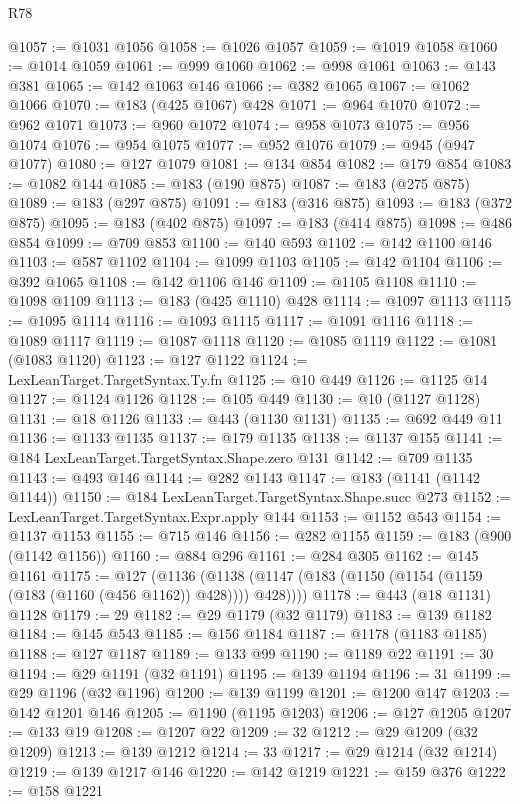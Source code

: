 \begin{lexlean}{R78}
\begin{coremodule}
@1057 := @1031 @1056
@1058 := @1026 @1057
@1059 := @1019 @1058
@1060 := @1014 @1059
@1061 := @999 @1060
@1062 := @998 @1061
@1063 := @143 @381
@1065 := @142 @1063 @146
@1066 := @382 @1065
@1067 := @1062 @1066
@1070 := @183 (@425 @1067) @428
@1071 := @964 @1070
@1072 := @962 @1071
@1073 := @960 @1072
@1074 := @958 @1073
@1075 := @956 @1074
@1076 := @954 @1075
@1077 := @952 @1076
@1079 := @945 (@947 @1077)
@1080 := @127 @1079
@1081 := @134 @854
@1082 := @179 @854
@1083 := @1082 @144
@1085 := @183 (@190 @875)
@1087 := @183 (@275 @875)
@1089 := @183 (@297 @875)
@1091 := @183 (@316 @875)
@1093 := @183 (@372 @875)
@1095 := @183 (@402 @875)
@1097 := @183 (@414 @875)
@1098 := @486 @854
@1099 := @709 @853
@1100 := @140 @593
@1102 := @142 @1100 @146
@1103 := @587 @1102
@1104 := @1099 @1103
@1105 := @142 @1104
@1106 := @392 @1065
@1108 := @142 @1106 @146
@1109 := @1105 @1108
@1110 := @1098 @1109
@1113 := @183 (@425 @1110) @428
@1114 := @1097 @1113
@1115 := @1095 @1114
@1116 := @1093 @1115
@1117 := @1091 @1116
@1118 := @1089 @1117
@1119 := @1087 @1118
@1120 := @1085 @1119
@1122 := @1081 (@1083 @1120)
@1123 := @127 @1122
@1124 := LexLeanTarget.TargetSyntax.Ty.fn
@1125 := @10 @449
@1126 := @1125 @14
@1127 := @1124 @1126
@1128 := @105 @449
@1130 := @10 (@1127 @1128)
@1131 := @18 @1126
@1133 := @443 (@1130 @1131)
@1135 := @692 @449 @11
@1136 := @1133 @1135
@1137 := @179 @1135
@1138 := @1137 @155
@1141 := @184 LexLeanTarget.TargetSyntax.Shape.zero @131
@1142 := @709 @1135
@1143 := @493 @146
@1144 := @282 @1143
@1147 := @183 (@1141 (@1142 @1144))
@1150 := @184 LexLeanTarget.TargetSyntax.Shape.succ @273
@1152 := LexLeanTarget.TargetSyntax.Expr.apply @144
@1153 := @1152 @543
@1154 := @1137 @1153
@1155 := @715 @146
@1156 := @282 @1155
@1159 := @183 (@900 (@1142 @1156))
@1160 := @884 @296
@1161 := @284 @305
@1162 := @145 @1161
@1175 := @127
    (@1136 (@1138 (@1147 (@183 (@1150 (@1154 (@1159 (@183 (@1160 (@456 @1162)) @428)))) @428))))
@1178 := @443 (@18 @1131) @1128
@1179 := 29
@1182 := @29 @1179 (@32 @1179)
@1183 := @139 @1182
@1184 := @145 @543
@1185 := @156 @1184
@1187 := @1178 (@1183 @1185)
@1188 := @127 @1187
@1189 := @133 @99
@1190 := @1189 @22
@1191 := 30
@1194 := @29 @1191 (@32 @1191)
@1195 := @139 @1194
@1196 := 31
@1199 := @29 @1196 (@32 @1196)
@1200 := @139 @1199
@1201 := @1200 @147
@1203 := @142 @1201 @146
@1205 := @1190 (@1195 @1203)
@1206 := @127 @1205
@1207 := @133 @19
@1208 := @1207 @22
@1209 := 32
@1212 := @29 @1209 (@32 @1209)
@1213 := @139 @1212
@1214 := 33
@1217 := @29 @1214 (@32 @1214)
@1219 := @139 @1217 @146
@1220 := @142 @1219
@1221 := @159 @376
@1222 := @158 @1221

\end{coremodule}
\end{lexlean}
